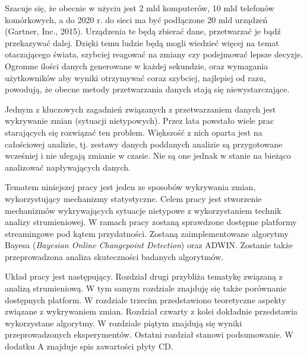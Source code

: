 Szacuje się,
że obecnie w użyciu jest 2 mld komputerów,
10 mld telefonów komórkowych,
a do 2020 r. do sieci ma być podłączone 20 mld urządzeń (Gartner, Inc., 2015).
Urządzenia te będą zbierać dane,
przetwarzać je
bądź przekazywać dalej.
Dzięki temu ludzie będą mogli wiedzieć więcej na temat otaczającego świata,
szybciej reagować na zmiany
czy podejmować lepsze decyzje.
Ogromne ilości danych generowane w każdej sekundzie,
oraz wymagania użytkowników aby wyniki otrzymywać coraz szybciej,
najlepiej od razu,
powodują,
że obecne metody przetwarzania danych stają się niewystarczające.

Jednym z kluczowych zagadnień związanych z przetwarzaniem danych jest wykrywanie zmian (sytuacji nietypowych).
Przez lata powstało wiele prac starających się rozwiązać ten problem.
Większość z nich oparta jest na całościowej analizie,
tj. zestawy danych poddanych analizie są przygotowane wcześniej i nie ulegają zmianie w czasie.
Nie są one jednak w stanie na bieżąco analizować napływających danych.

Tematem niniejszej pracy jest jeden ze sposobów wykrywania zmian,
wykorzystujący mechanizmy statystyczne.
Celem pracy jest stworzenie mechanizmów wykrywających sytuacje nietypowe
z wykorzystaniem technik analizy strumieniowej.
W ramach pracy zostaną sprawdzone dostępne platformy streamingowe pod kątem przydatności.
Zostaną zaimplementowane algorytmy Bayesa (\textit{Bayesian Online Changepoint Detection})
oraz ADWIN.
Zostanie także przeprowadzona analiza skuteczności badanych algorytmów.

Układ pracy jest następujący.
Rozdział drugi przybliża tematykę związaną z analizą strumieniową.
W tym samym rozdziale znajduję się także porównanie dostępnych platform.
W rozdziale trzecim przedstawiono teoretyczne aspekty związane z wykrywaniem zmian.
Rozdział czwarty z kolei dokładnie przedstawia wykorzystane algorytmy.
W rozdziale piątym znajdują się wyniki przeprowadzonych eksperymentów.
Ostatni rozdział stanowi podsumowanie.
W dodatku A znajduje spis zawartości płyty CD.
